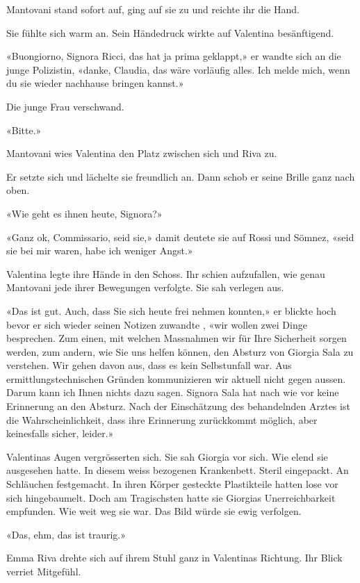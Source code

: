 Mantovani stand sofort auf, ging auf sie zu und reichte ihr die Hand.

Sie fühlte sich warm an. Sein Händedruck wirkte auf Valentina
besänftigend.

«Buongiorno, Signora Ricci, das hat ja prima geklappt,» er wandte sich
an die junge Polizistin, «danke, Claudia, das wäre vorläufig alles. Ich
melde mich, wenn du sie wieder nachhause bringen kannst.»

Die junge Frau verschwand.

«Bitte.»

Mantovani wies Valentina den Platz zwischen sich und Riva zu.

Er setzte sich und lächelte sie freundlich an. Dann schob er seine
Brille ganz nach oben.

«Wie geht es ihnen heute, Signora?»

«Ganz ok, Commissario, seid sie,» damit deutete sie auf Rossi und
Sömnez, «seid sie bei mir waren, habe ich weniger Angst.»

Valentina legte ihre Hände in den Schoss. Ihr schien aufzufallen, wie
genau Mantovani jede ihrer Bewegungen verfolgte. Sie sah verlegen aus.

«Das ist gut. Auch, dass Sie sich heute frei nehmen konnten,» er blickte
hoch bevor er sich wieder seinen Notizen zuwandte , «wir wollen zwei
Dinge besprechen. Zum einen, mit welchen Massnahmen wir für Ihre
Sicherheit sorgen werden, zum andern, wie Sie uns helfen können, den
Absturz von Giorgia Sala zu verstehen. Wir gehen davon aus, dass es kein
Selbstunfall war. Aus ermittlungstechnischen Gründen kommunizieren wir
aktuell nicht gegen aussen. Darum kann ich Ihnen nichts dazu sagen.
Signora Sala hat nach wie vor keine Erinnerung an den Absturz. Nach der
Einschätzung des behandelnden Arztes ist die Wahrscheinlichkeit, dass
ihre Erinnerung zurückkommt möglich, aber keinesfalls sicher, leider.»

Valentinas Augen vergrösserten sich. Sie sah Giorgia vor sich. Wie elend
sie ausgesehen hatte. In diesem weiss bezogenen Krankenbett. Steril
eingepackt. An Schläuchen festgemacht. In ihren Körper gesteckte
Plastikteile hatten lose vor sich hingebaumelt. Doch am Tragischsten
hatte sie Giorgias Unerreichbarkeit empfunden. Wie weit weg sie war. Das
Bild würde sie ewig verfolgen.

«Das, ehm, das ist traurig.»

Emma Riva drehte sich auf ihrem Stuhl ganz in Valentinas Richtung. Ihr
Blick verriet Mitgefühl.

